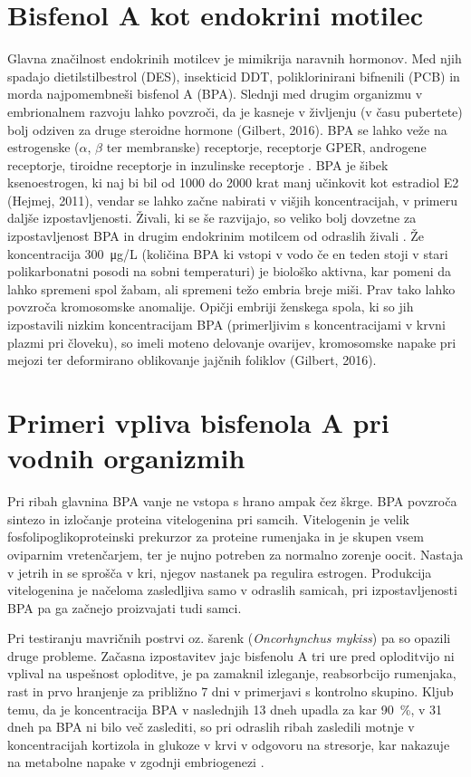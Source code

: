 \documentclass[a4paper, 11pt]{article}
\begin{document}
\section*{Bisfenol A kot endokrini motilec}
Glavna značilnost endokrinih motilcev je mimikrija naravnih hormonov. Med njih spadajo dietilstilbestrol (DES), insekticid DDT, poliklorinirani bifnenili (PCB) in morda najpomembneši bisfenol A (BPA). Slednji med drugim organizmu v embrionalnem razvoju lahko povzroči, da je kasneje v življenju (v času pubertete) bolj odziven za druge steroidne hormone {\color{red} (Gilbert, 2016)}. BPA se lahko veže na estrogenske ($\alpha$, $\beta$ ter membranske) receptorje, receptorje GPER, androgene receptorje, tiroidne receptorje in inzulinske receptorje \parencite{lombo2015transgenerational}. BPA je šibek ksenoestrogen, ki naj bi bil od 1000 do 2000 krat manj učinkovit kot estradiol E2 {\color{red} (Hejmej, 2011)}, vendar se lahko začne nabirati v višjih koncentracijah, v primeru daljše izpostavljenosti. Živali, ki se še razvijajo, so veliko bolj dovzetne za izpostavljenost BPA in drugim endokrinim motilcem od odraslih živali \parencite{miyagawa2016bisphenol}. Že koncentracija \SI{300}{\micro g/L} (količina BPA ki vstopi v vodo če en teden stoji v stari polikarbonatni posodi na sobni temperaturi) je biološko aktivna, kar pomeni da lahko spremeni spol žabam, ali spremeni težo embria breje miši. Prav tako lahko povzroča kromosomske anomalije. Opičji {\color{red}embriji} ženskega spola, ki so jih izpostavili nizkim koncentracijam BPA (primerljivim s koncentracijami v krvni plazmi pri človeku), so imeli moteno delovanje ovarijev, kromosomske napake pri mejozi ter deformirano oblikovanje jajčnih foliklov {\color{red} (Gilbert, 2016)}.


\section*{Primeri vpliva bisfenola A pri vodnih organizmih}
Pri ribah glavnina BPA vanje ne vstopa s hrano ampak čez škrge. BPA povzroča sintezo in izločanje proteina vitelogenina pri samcih. Vitelogenin je velik fosfolipoglikoproteinski prekurzor za proteine rumenjaka in je skupen vsem oviparnim vretenčarjem, ter je nujno potreben za normalno zorenje oocit. Nastaja v jetrih in se sprošča v kri, njegov nastanek pa regulira estrogen. Produkcija vitelogenina je {\color{red}načeloma} zasledljiva samo v odraslih samicah, pri izpostavljenosti BPA pa ga začnejo {\color{red}proizvajati} tudi samci. 

Pri testiranju mavričnih postrvi oz. šarenk ({\it Oncorhynchus mykiss}) pa so opazili druge probleme. Začasna izpostavitev jajc bisfenolu A tri ure pred oploditvijo ni vplival na uspešnost oploditve, je pa zamaknil izleganje, reabsorbcijo rumenjaka, rast in prvo hranjenje za približno 7 dni v primerjavi s kontrolno skupino. Kljub temu, da je koncentracija BPA v naslednjih 13 dneh upadla za kar \SI{90}{\percent}, v 31 dneh pa BPA ni bilo več zaslediti, so pri odraslih ribah zasledili motnje v koncentracijah kortizola in glukoze v krvi v odgovoru na stresorje, kar nakazuje na metabolne napake v zgodnji embriogenezi \parencite{canesi2015environmental}.
\end{document}
